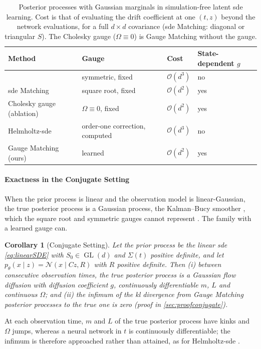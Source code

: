 \documentclass{article} %
\newcommand{\vol}{g}
\newcommand{\gauge}{\Omega}
\newcommand{\gl}{\operatorname{GL}}
\newcommand{\Norm}{\mathcal{N}}
\newtheorem{corollary}[theorem]{Corollary}
\begin{document}
\begin{table}[t]
    \centering
    \caption{Posterior processes with Gaussian marginals in simulation-free latent \gls{sde} learning. Cost is that of evaluating the drift coefficient at one $(t, z)$ beyond the network evaluations, for a full $d \times d$ covariance (\gls{sde} Matching: diagonal or triangular $S$). The Cholesky gauge ($\gauge \equiv 0$) is Gauge Matching without the gauge.}
    \label{tab:methods}
    \small
    \begin{tabular}{llll}
        \toprule
        Method & Gauge & Cost & State-dependent $\vol$ \\
        \midrule
        \citet{course2023amortized,course2023state} & symmetric, fixed & $\mathcal{O}(d^3)$ & no \\
        \gls{sde} Matching \citep{bartosh2025sde} & square root, fixed & $\mathcal{O}(d^2)$ & yes \\
        Cholesky gauge (ablation) & $\gauge \equiv 0$, fixed & $\mathcal{O}(d^2)$ & yes \\
        Helmholtz-\gls{sde} \citep{smith2026closing} & order-one correction, computed & $\mathcal{O}(d^3)$ & no \\
        Gauge Matching (ours) & learned & $\mathcal{O}(d^2)$ & yes \\
        \bottomrule
    \end{tabular}
\end{table}

\paragraph{Exactness in the Conjugate Setting}
When the prior process is linear and the observation model is linear-Gaussian, the true posterior process is a Gaussian process, the Kalman--Bucy smoother \citep{Särkkä_Solin_2019}, which the square root and symmetric gauges cannot represent \citep{smith2026closing}. The family with a learned gauge can.
\begin{corollary}[Conjugate Setting]
\label{cor:conjugate}
Let the prior process be the linear \gls{sde} \cref{eq:linearSDE} with $S_0 \in \gl(d)$ and $\Sigma(t)$ positive definite, and let $p_\theta(x \mid z) = \Norm(x \mid C z, R)$ with $R$ positive definite. Then (i) between consecutive observation times, the true posterior process is a Gaussian flow diffusion with diffusion coefficient $\vol$, continuously differentiable $m$, $L$ and continuous $\gauge$; and (ii) the infimum of the \gls{kl} divergence from Gauge Matching posterior processes to the true one is zero (proof in \cref{sec:proofconjugate}).
\end{corollary}
At each observation time, $m$ and $L$ of the true posterior process have kinks and $\gauge$ jumps, whereas a neural network in $t$ is continuously differentiable; the infimum is therefore approached rather than attained, as for Helmholtz-\gls{sde} \citep[Theorem 1]{smith2026closing}.
\end{document}
